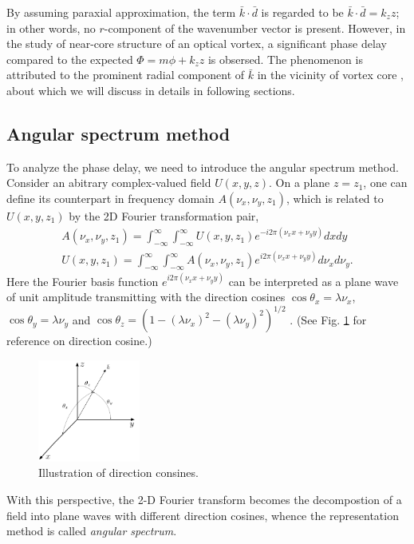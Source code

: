 By assuming paraxial approximation, the term $\bar{k} \cdot \bar{d}$ is regarded to be $\bar{k} \cdot \bar{d} = k_z z$; in other words, no $r$-component of the wavenumber vector is present. However, in the study of near-core structure of an optical vortex, a significant phase delay compared to the expected $\Phi = m\phi + k_z z$ is obsersed. The phenomenon is attributed to the prominent radial component of $\bar{k}$ in the vicinity of vortex core \cite{Near16}, about which we will discuss in details in following sections.

\subsection{Angular spectrum method}

To analyze the phase delay, we need to introduce the angular spectrum method. Consider an abitrary complex-valued field $U(x, y, z)$. On a plane $z = z_1$, one can define its counterpart in frequency domain $A(\nu_x, \nu_y, z_1)$, which is related to $U(x, y, z_1)$ by the 2D Fourier transformation pair,
\begin{eqnarray}
	A(\nu_x, \nu_y, z_1) = \int_{-\infty}^{\infty} \int_{-\infty}^{\infty} U(x, y, z_1)
	e^{-i 2 \pi (\nu_x x + \nu_y y)} dx dy
	\nonumber\\
	U(x, y, z_1) = \int_{-\infty}^{\infty} \int_{-\infty}^{\infty} A(\nu_x, \nu_y, z_1)
	e^{i 2 \pi (\nu_x x + \nu_y y)} d\nu_x d\nu_y.
	\nonumber
\end{eqnarray}
Here the Fourier basis function $e^{i2\pi (\nu_x x + \nu_y y)}$ can be interpreted as a plane wave of unit amplitude transmitting with the direction cosines $\cos\theta_x = \lambda \nu_x$, $\cos\theta_y = \lambda \nu_y$ and $\cos\theta_z = (1 - (\lambda \nu_x)^2 - (\lambda \nu_y)^2)^{1/2}$ \cite{Fo04}. (See Fig. \ref{fig:dirc_cos} for reference on direction cosine.)
\begin{figure}
	\centering
	\includegraphics[width = 0.3\textwidth]{direction_cosines.jpg}
	\caption{Illustration of direction consines.}
	\label{fig:dirc_cos}
\end{figure}
With this perspective, the 2-D Fourier transform becomes the decompostion of a field into plane waves with different direction cosines, whence the representation method is called {\em angular spectrum}.



